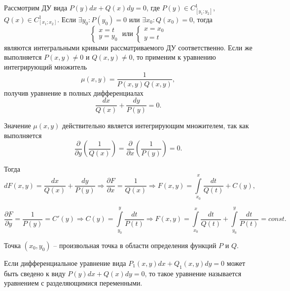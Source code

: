 Рассмотрим ДУ вида $P(y)dx + Q(x)dy = 0$, где $P(y) \in C_{[y_1; y_2]}^1$, $Q(x) \in C_{[x_1; x_2]}^1$. Если $\exists y_0: P(y_0) = 0$ или  $\exists x_0: Q(x_0) = 0$, тогда
\begin{equation}
    \begin{cases}
        x = t \\ 
        y = y_0
    \end{cases} \;
    \text{или} \;
    \begin{cases}
        x = x_0 \\ 
        y = t
    \end{cases}
\end{equation}
являются интегральными кривыми рассматриваемого ДУ соответственно. Если же выполняется $P(x, y) \neq 0$ и $Q(x, y) \neq 0$, то применим к уравнению интегрирующий множитель
\[ \mu(x, y) = \frac{1}{P(x, y)Q(x, y)}, \]
получив уравнение в полных дифференциалах
\begin{equation}
    \frac{dx}{Q(x)} + \frac{dy}{P(y)} = 0.
\end{equation}

Значение $\mu(x, y)$ действительно является интегрирующим множителем, так как выполняется
\begin{equation}
    \frac{\partial}{\partial y} \left( \frac{1}{Q(x)} \right) =  \frac{\partial}{\partial x} \left( \frac{1}{P(y)} \right) = 0.
\end{equation}

Тогда
\begin{equation}
    dF(x, y) = \frac{dx}{Q(x)} + \frac{dy}{P(y)} \Rightarrow \frac{\partial F}{\partial x} = \frac{1}{Q(x)} \Rightarrow F(x, y) = \int\limits_{x_0}^{x} \frac{dt}{Q(t)} + C(y),
\end{equation}

\begin{equation}
    \frac{\partial F}{\partial y} = \frac{1}{P(y)} = C'(y) \Rightarrow C(y) = \int\limits_{y_0}^{y} \frac{dt}{P(t)} \Rightarrow F(x, y) = \int\limits_{x_0}^{x} \frac{dt}{Q(t)} + \int\limits_{y_0}^{y} \frac{dt}{P(t)} = const.
\end{equation}

Точка $(x_0, y_0)$ -- произвольная точка в области определения функций $P$ и $Q$.

\begin{definition}
    Если дифференциальное уравнение вида $P_1(x, y)dx + Q_1(x, y)dy = 0$ может быть сведено к виду $P(y)dx + Q(x)dy = 0$, то такое уравнение называется уравнением с разделяющимися переменными.
\end{definition}

